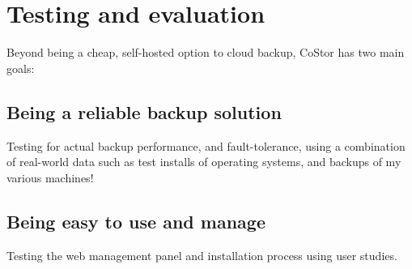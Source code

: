 \documentclass[bsc,frontabs,twoside,singlespacing,parskip,deptreport]{infthesis}     %
\begin{document}
\chapter{Testing and evaluation}

Beyond being a cheap, self-hosted option to cloud backup, CoStor has two main goals:

\section{Being a reliable backup solution}

Testing for actual backup performance, and fault-tolerance, using a combination of real-world data
such as test installs of operating systems, and backups of my various machines!

\section{Being easy to use and manage}

Testing the web management panel and installation process using user studies.



\end{document}
